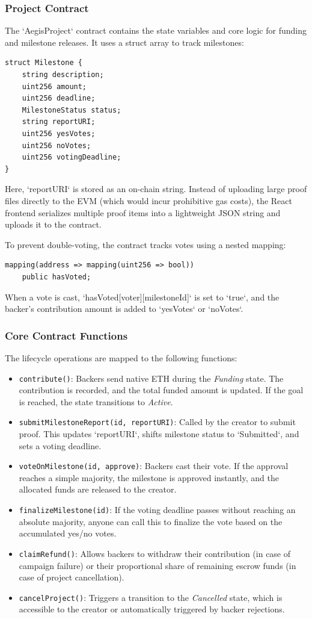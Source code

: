 \documentclass[conference]{IEEEtran}
\begin{document}
\subsubsection{Project Contract}
The `AegisProject` contract contains the state variables and core logic for funding and milestone releases. It uses a struct array to track milestones:
\begin{verbatim}
struct Milestone {
    string description;
    uint256 amount;
    uint256 deadline;
    MilestoneStatus status;
    string reportURI;
    uint256 yesVotes;
    uint256 noVotes;
    uint256 votingDeadline;
}
\end{verbatim}
Here, `reportURI` is stored as an on-chain string. Instead of uploading large proof files directly to the EVM (which would incur prohibitive gas costs), the React frontend serializes multiple proof items into a lightweight JSON string and uploads it to the contract.

To prevent double-voting, the contract tracks votes using a nested mapping:
\begin{verbatim}
mapping(address => mapping(uint256 => bool)) 
    public hasVoted;
\end{verbatim}
When a vote is cast, `hasVoted[voter][milestoneId]` is set to `true`, and the backer's contribution amount is added to `yesVotes` or `noVotes`.

\subsubsection{Core Contract Functions}
The lifecycle operations are mapped to the following functions:
\begin{itemize}
	\item \texttt{contribute()}: Backers send native ETH during the \textit{Funding} state. The contribution is recorded, and the total funded amount is updated. If the goal is reached, the state transitions to \textit{Active}.
	\item \texttt{submitMilestoneReport(id, reportURI)}: Called by the creator to submit proof. This updates `reportURI`, shifts milestone status to `Submitted`, and sets a voting deadline.
	\item \texttt{voteOnMilestone(id, approve)}: Backers cast their vote. If the approval reaches a simple majority, the milestone is approved instantly, and the allocated funds are released to the creator.
	\item \texttt{finalizeMilestone(id)}: If the voting deadline passes without reaching an absolute majority, anyone can call this to finalize the vote based on the accumulated yes/no votes.
	\item \texttt{claimRefund()}: Allows backers to withdraw their contribution (in case of campaign failure) or their proportional share of remaining escrow funds (in case of project cancellation).
	\item \texttt{cancelProject()}: Triggers a transition to the \textit{Cancelled} state, which is accessible to the creator or automatically triggered by backer rejections.
\end{itemize}
\end{document}
